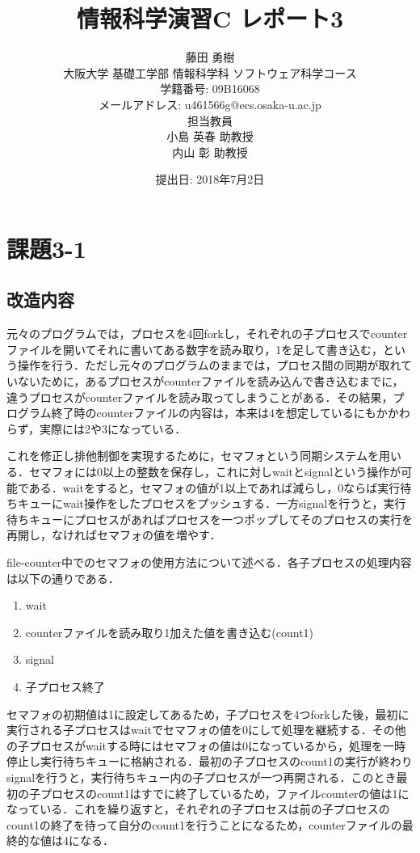 \documentclass[a4j,10pt,titlepage]{jsarticle}
\title{情報科学演習C レポート3}
\author{藤田 勇樹 \\
大阪大学 基礎工学部 情報科学科 ソフトウェア科学コース\\
学籍番号: 09B16068 \\
メールアドレス: u461566g@ecs.osaka-u.ac.jp \\
担当教員\\
小島 英春 助教授 \\
内山 彰 助教授}
\date{提出日: 2018年7月2日}
\begin{document}
\maketitle
\section{課題3-1}

\subsection{改造内容}
元々のプログラムでは，プロセスを4回forkし，それぞれの子プロセスでcounterファイルを開いてそれに書いてある数字を読み取り，1を足して書き込む，という操作を行う．ただし元々のプログラムのままでは，プロセス間の同期が取れていないために，あるプロセスがcounterファイルを読み込んで書き込むまでに，違うプロセスがcounterファイルを読み取ってしまうことがある．その結果，プログラム終了時のcounterファイルの内容は，本来は4を想定しているにもかかわらず，実際には2や3になっている．

これを修正し排他制御を実現するために，セマフォという同期システムを用いる．セマフォには0以上の整数を保存し，これに対しwaitとsignalという操作が可能である．waitをすると，セマフォの値が1以上であれば減らし，0ならば実行待ちキューにwait操作をしたプロセスをプッシュする．一方signalを行うと，実行待ちキューにプロセスがあればプロセスを一つポップしてそのプロセスの実行を再開し，なければセマフォの値を増やす．

file-counter中でのセマフォの使用方法について述べる．各子プロセスの処理内容は以下の通りである．
\begin{enumerate}
  \item wait
  \item counterファイルを読み取り1加えた値を書き込む(count1)
  \item signal
  \item 子プロセス終了
\end{enumerate}

セマフォの初期値は1に設定してあるため，子プロセスを4つforkした後，最初に実行される子プロセスはwaitでセマフォの値を0にして処理を継続する．その他の子プロセスがwaitする時にはセマフォの値は0になっているから，処理を一時停止し実行待ちキューに格納される．最初の子プロセスのcount1の実行が終わりsignalを行うと，実行待ちキュー内の子プロセスが一つ再開される．このとき最初の子プロセスのcount1はすでに終了しているため，ファイルcounterの値は1になっている．これを繰り返すと，それぞれの子プロセスは前の子プロセスのcount1の終了を待って自分のcount1を行うことになるため，counterファイルの最終的な値は4になる．
\end{document}
